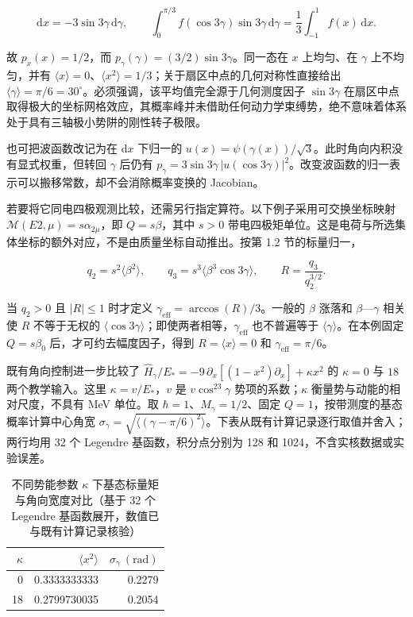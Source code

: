 \begin{equation}\label{eq:2-4-17}
\mathrm dx=-3\sin3\gamma\,\mathrm d\gamma,\qquad
\int_0^{\pi/3}f(\cos3\gamma)\sin3\gamma\,\mathrm d\gamma
=\frac13\int_{-1}^{1}f(x)\,\mathrm dx.
\end{equation}

故 $p_x(x)=1/2$，而 $p_\gamma(\gamma)=(3/2)\sin3\gamma$。同一态在 $x$ 上均匀、在 $\gamma$ 上不均匀，并有 $\langle x\rangle=0$、$\langle x^2\rangle=1/3$；关于扇区中点的几何对称性直接给出 $\langle\gamma\rangle=\pi/6=30^\circ$。必须强调，该平均值完全源于几何测度因子 $\sin 3\gamma$ 在扇区中点取得极大的坐标网格效应，其概率峰并未借助任何动力学束缚势，绝不意味着体系处于具有三轴极小势阱的刚性转子极限。

也可把波函数改记为在 $\mathrm dx$ 下归一的 $u(x)=\psi(\gamma(x))/\sqrt3$。此时角向内积没有显式权重，但转回 $\gamma$ 后仍有 $p_\gamma=3\sin3\gamma\,|u(\cos3\gamma)|^2$。改变波函数的归一表示可以搬移常数，却不会消除概率变换的 Jacobian。

若要将它同电四极观测比较，还需另行指定算符。以下例子采用可交换坐标映射 $\mathcal M(E2,\mu)=s\alpha_{2\mu}$，即 $Q=s\beta$，其中 $s>0$ 带电四极矩单位。这是电荷与所选集体坐标的额外对应，不是由质量坐标自动推出。按第 1.2 节的标量归一，

\begin{equation}\label{eq:2-4-18}
q_2=s^2\langle\beta^2\rangle,\qquad
q_3=s^3\langle\beta^3\cos3\gamma\rangle,\qquad
R=\frac{q_3}{q_2^{3/2}}.
\end{equation}

当 $q_2>0$ 且 $|R|\le1$ 时才定义 $\gamma_{\mathrm{eff}}=\arccos(R)/3$。一般的 $\beta$ 涨落和 $\beta$—$\gamma$ 相关使 $R$ 不等于无权的 $\langle\cos3\gamma\rangle$；即使两者相等，$\gamma_{\mathrm{eff}}$ 也不普遍等于 $\langle\gamma\rangle$。在本例固定 $Q=s\beta_0$ 后，才可约去幅度因子，得到 $R=\langle x\rangle=0$ 和 $\gamma_{\mathrm{eff}}=\pi/6$。

既有角向控制进一步比较了 $\hat H_\gamma/E_*=-9\,\partial_x[(1-x^2)\partial_x]+\kappa x^2$ 的 $\kappa=0$ 与 $18$ 两个教学输入。这里 $\kappa=v/E_*$，$v$ 是 $v\cos^23\gamma$ 势项的系数；$\kappa$ 衡量势与动能的相对尺度，不具有 MeV 单位。取 $\hbar=1$、$M_\gamma=1/2$、固定 $Q=1$，按带测度的基态概率计算中心角宽 $\sigma_\gamma=\sqrt{\langle(\gamma-\pi/6)^2\rangle}$。下表从既有计算记录逐行取值并舍入；两行均用 32 个 Legendre 基函数，积分点分别为 128 和 1024，不含实核数据或实验误差。

\begin{table}[htbp]
\centering
\caption{不同势能参数 $\kappa$ 下基态标量矩与角向宽度对比（基于 32 个 Legendre 基函数展开，数值已与既有计算记录核验）}
\label{tab:2-4-gamma-stats}
\begin{tabular}{rrr}
\hline
$\kappa$ & $\langle x^2\rangle$ & $\sigma_\gamma\ \mathrm{(rad)}$ \\
\hline
0 & 0.3333333333 & 0.2279 \\
18 & 0.2799730035 & 0.2054 \\
\hline
\end{tabular}
\end{table}


